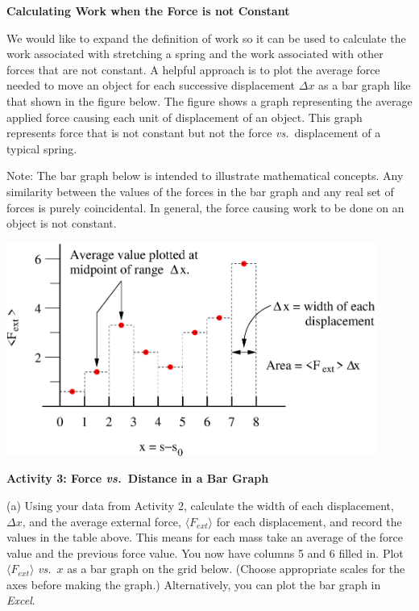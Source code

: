 \bigskip
\textbf{Calculating Work when the Force is not Constant }

We would like to expand the definition of work so it can be used to calculate
the work associated with stretching a spring and the work associated with other
forces that are not constant. A helpful approach is to plot the average force
needed to move an object for each successive displacement \( \Delta  x\) as
a bar graph like that shown in the figure below. The figure shows a graph representing
the average applied force causing each unit of displacement of an object. This
graph represents force that is not constant but not the force \textit{vs.}~displacement
of a typical spring.

Note: The bar graph below is intended to illustrate mathematical concepts. Any
similarity between the values of the forces in the bar graph and any real set
of forces is purely coincidental. In general, the force causing work to be done
on an object is not constant.

\vspace{0.3cm}
{\par\centering \includegraphics[height=2.75in]{work_kinetic/workAndKEF1.eps} \par}
\vspace{0.3cm}

\textbf{Activity 3: Force \textit{vs.}~Distance in a Bar Graph }

(a) Using your data from Activity 2, calculate the width of each displacement, \( \Delta x \), and the average external force, \(\langle F_{ext} \rangle\) for each displacement, and record the values in the table above. This means for each mass take an average of the force value and the previous force value. You now have columns 5 and 6 filled in. Plot \( \langle F_{ext} \rangle\) \textit{vs.}~$x$ as a bar graph on the grid below.  (Choose appropriate scales for the axes before making the graph.) Alternatively, you can plot the bar graph in \textit{Excel}.

